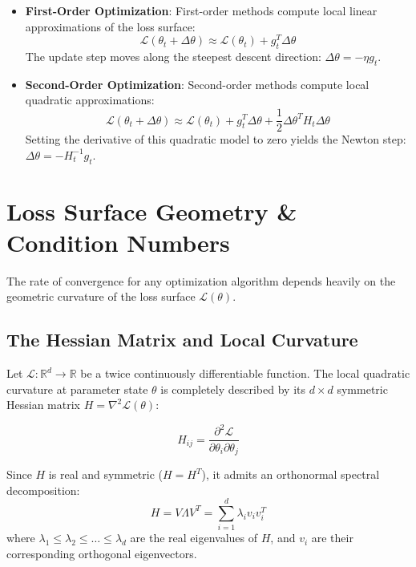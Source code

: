 \begin{conceptbox}
\begin{itemize}[leftmargin=*]
    \item \textbf{First-Order Optimization}: First-order methods compute local linear approximations of the loss surface:
    $$\mathcal{L}(\theta_t + \Delta \theta) \approx \mathcal{L}(\theta_t) + g_t^T \Delta \theta$$
    The update step moves along the steepest descent direction: $\Delta \theta = -\eta g_t$.
    \item \textbf{Second-Order Optimization}: Second-order methods compute local quadratic approximations:
    $$\mathcal{L}(\theta_t + \Delta \theta) \approx \mathcal{L}(\theta_t) + g_t^T \Delta \theta + \frac{1}{2} \Delta \theta^T H_t \Delta \theta$$
    Setting the derivative of this quadratic model to zero yields the Newton step: $\Delta \theta = -H_t^{-1} g_t$.
\end{itemize}
\end{conceptbox}

\section{Loss Surface Geometry \& Condition Numbers}
The rate of convergence for any optimization algorithm depends heavily on the geometric curvature of the loss surface $\mathcal{L}(\theta)$. 

\subsection{The Hessian Matrix and Local Curvature}
Let $\mathcal{L}: \mathbb{R}^d \to \mathbb{R}$ be a twice continuously differentiable function. The local quadratic curvature at parameter state $\theta$ is completely described by its $d \times d$ symmetric Hessian matrix $H = \nabla^2 \mathcal{L}(\theta)$:

\begin{equation}
H_{ij} = \frac{\partial^2 \mathcal{L}}{\partial \theta_i \partial \theta_j}
\end{equation}

Since $H$ is real and symmetric ($H = H^T$), it admits an orthonormal spectral decomposition:
\begin{equation}
H = V \Lambda V^T = \sum_{i=1}^d \lambda_i v_i v_i^T
\end{equation}
where $\lambda_1 \le \lambda_2 \le \dots \le \lambda_d$ are the real eigenvalues of $H$, and $v_i$ are their corresponding orthogonal eigenvectors.

